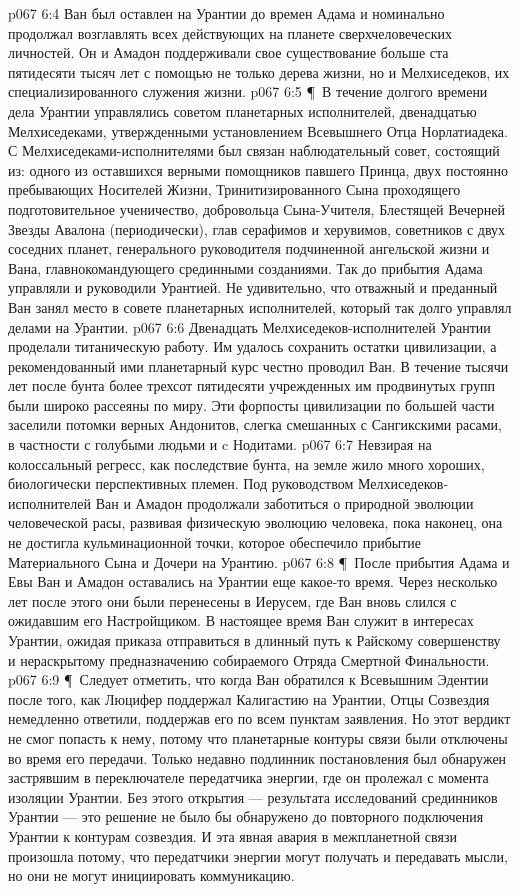 \vs p067 6:4 Ван был оставлен на Урантии до времен Адама и номинально продолжал возглавлять всех действующих на планете сверхчеловеческих личностей. Он и Амадон поддерживали свое существование больше ста пятидесяти тысяч лет с помощью не только дерева жизни, но и Мелхиседеков, их специализированного служения жизни.
\vs p067 6:5 \P\ В течение долгого времени дела Урантии управлялись советом планетарных исполнителей, двенадцатью Мелхиседеками, утвержденными установлением Всевышнего Отца Норлатиадека. С Мелхиседеками\hyp{}исполнителями был связан наблюдательный совет, состоящий из: одного из оставшихся верными помощников павшего Принца, двух постоянно пребывающих Носителей Жизни, Тринитизированного Сына проходящего подготовительное ученичество, добровольца Сына\hyp{}Учителя, Блестящей Вечерней Звезды Авалона (периодически), глав серафимов и херувимов, советников с двух соседних планет, генерального руководителя подчиненной ангельской жизни и Вана, главнокомандующего срединными созданиями. Так до прибытия Адама управляли и руководили Урантией. Не удивительно, что отважный и преданный Ван занял место в совете планетарных исполнителей, который так долго управлял делами на Урантии.
\vs p067 6:6 Двенадцать Мелхиседеков\hyp{}исполнителей Урантии проделали титаническую работу. Им удалось сохранить остатки цивилизации, а рекомендованный ими планетарный курс честно проводил Ван. В течение тысячи лет после бунта более трехсот пятидесяти учрежденных им продвинутых групп были широко рассеяны по миру. Эти форпосты цивилизации по большей части заселили потомки верных Андонитов, слегка смешанных с Сангикскими расами, в частности с голубыми людьми и c Нодитами.
\vs p067 6:7 Невзирая на колоссальный регресс, как последствие бунта, на земле жило много хороших, биологически перспективных племен. Под руководством Мелхиседеков\hyp{}исполнителей Ван и Амадон продолжали заботиться о природной эволюции человеческой расы, развивая физическую эволюцию человека, пока наконец, она не достигла кульминационной точки, которое обеспечило прибытие Материального Сына и Дочери на Урантию.
\vs p067 6:8 \P\ После прибытия Адама и Евы Ван и Амадон оставались на Урантии еще какое\hyp{}то время. Через несколько лет после этого они были перенесены в Иерусем, где Ван вновь слился с ожидавшим его Настройщиком. В настоящее время Ван служит в интересах Урантии, ожидая приказа отправиться в длинный путь к Райскому совершенству и нераскрытому предназначению собираемого Отряда Смертной Финальности.
\vs p067 6:9 \P\ Следует отметить, что когда Ван обратился к Всевышним Эдентии после того, как Люцифер поддержал Калигастию на Урантии, Отцы Созвездия немедленно ответили, поддержав его по всем пунктам заявления. Но этот вердикт не смог попасть к нему, потому что планетарные контуры связи были отключены во время его передачи. Только недавно подлинник постановления был обнаружен застрявшим в переключателе передатчика энергии, где он пролежал с момента изоляции Урантии. Без этого открытия --- результата исследований срединников Урантии --- это решение не было бы обнаружено до повторного подключения Урантии к контурам созвездия. И эта явная авария в межпланетной связи произошла потому, что передатчики энергии могут получать и передавать мысли, но они не могут инициировать коммуникацию.

